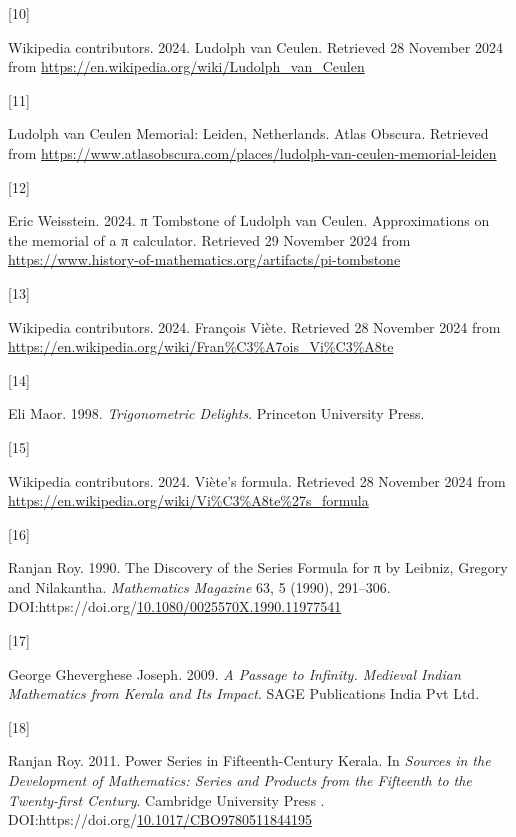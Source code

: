 \documentclass[
  a4paper,
]{article}
\newlength{\cslhangindent}
\newlength{\csllabelwidth}
\newenvironment{CSLReferences}[2] %
 {\begin{list}{}{%
  \setlength{\itemindent}{0pt}
  \setlength{\leftmargin}{0pt}
  \setlength{\parsep}{0pt}
  \ifodd #1
   \setlength{\leftmargin}{\cslhangindent}
   \setlength{\itemindent}{-1\cslhangindent}
  \fi
  \setlength{\itemsep}{#2\baselineskip}}}
 {\end{list}}
\newcommand{\CSLLeftMargin}[1]{\parbox[t]{\csllabelwidth}{\strut#1\strut}}
\newcommand{\CSLRightInline}[1]{\parbox[t]{\linewidth - \csllabelwidth}{\strut#1\strut}}
\begin{document}
\begin{CSLReferences}{0}{0}
\CSLLeftMargin{{[}10{]} }%
\CSLRightInline{Wikipedia contributors. 2024. {Ludolph van Ceulen}.
Retrieved 28 November 2024 from
\url{https://en.wikipedia.org/wiki/Ludolph_van_Ceulen}}

\CSLLeftMargin{{[}11{]} }%
\CSLRightInline{{Ludolph van Ceulen Memorial: Leiden, Netherlands}.
{Atlas Obscura}. Retrieved from
\url{https://www.atlasobscura.com/places/ludolph-van-ceulen-memorial-leiden}}

\CSLLeftMargin{{[}12{]} }%
\CSLRightInline{Eric Weisstein. 2024. {π Tombstone of Ludolph van
Ceulen}. {Approximations on the memorial of a π calculator}. Retrieved
29 November 2024 from
\url{https://www.history-of-mathematics.org/artifacts/pi-tombstone}}

\CSLLeftMargin{{[}13{]} }%
\CSLRightInline{Wikipedia contributors. 2024. {François Viète}.
Retrieved 28 November 2024 from
\url{https://en.wikipedia.org/wiki/Fran\%C3\%A7ois_Vi\%C3\%A8te}}

\CSLLeftMargin{{[}14{]} }%
\CSLRightInline{Eli Maor. 1998. \emph{{Trigonometric Delights}}.
Princeton University Press.}

\CSLLeftMargin{{[}15{]} }%
\CSLRightInline{Wikipedia contributors. 2024. {Viète's formula}.
Retrieved 28 November 2024 from
\url{https://en.wikipedia.org/wiki/Vi\%C3\%A8te\%27s_formula}}

\CSLLeftMargin{{[}16{]} }%
\CSLRightInline{Ranjan Roy. 1990. {The Discovery of the Series Formula
for π by Leibniz, Gregory and Nilakantha}. \emph{{Mathematics Magazine}}
63, 5 (1990), 291--306.
DOI:https://doi.org/\href{https://doi.org/10.1080/0025570X.1990.11977541}{10.1080/0025570X.1990.11977541}}

\CSLLeftMargin{{[}17{]} }%
\CSLRightInline{George Gheverghese Joseph. 2009. \emph{{A Passage to
Infinity}. {Medieval Indian Mathematics from Kerala and Its Impact}}.
{SAGE Publications India Pvt Ltd}.}

\CSLLeftMargin{{[}18{]} }%
\CSLRightInline{Ranjan Roy. 2011. {Power Series in Fifteenth-Century
Kerala}. In \emph{{Sources in the Development of Mathematics}: {Series
and Products from the Fifteenth to the Twenty-first Century}}.
{Cambridge University Press }.
DOI:https://doi.org/\href{https://doi.org/10.1017/CBO9780511844195}{10.1017/CBO9780511844195}}


\end{CSLReferences}
\end{document}

